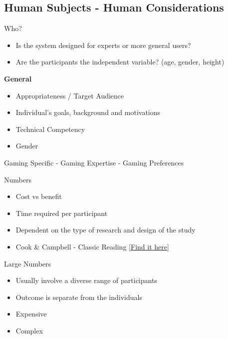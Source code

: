 \subsection{Human Subjects - Human
Considerations}\label{human-subjects---human-considerations}

\begin{frame}{Who?}

\begin{itemize}
\tightlist
\item
  Is the system designed for experts or more general users?
\item
  Are the participants the independent variable? (age, gender, height)
\end{itemize}

\textbf{General}

\begin{itemize}
\tightlist
\item
  Appropriateness / Target Audience
\item
  Individual's goals, background and motivations
\item
  Technical Competency
\item
  Gender
\end{itemize}

Gaming Specific - Gaming Expertise - Gaming Preferences

\end{frame}

\begin{frame}{Numbers}

\begin{itemize}
\tightlist
\item
  Cost vs benefit
\item
  Time required per participant
\item
  Dependent on the type of research and design of the study
\item
  Cook \& Campbell - Classic Reading
  \href{https://moodle2.units.it/pluginfile.php/132646/mod_resource/content/1/Estratto_ShadishCookCampbellExperimental2002.pdf}{{[}Find
  it here{]}}
\end{itemize}

\end{frame}

\begin{frame}{Large Numbers}

\begin{itemize}
\tightlist
\item
  Usually involve a diverse range of participants
\item
  Outcome is separate from the individuals
\item
  Expensive
\item
  Complex
\end{itemize}

\end{frame}

